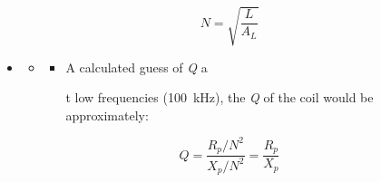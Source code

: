 \begin{equation}
N = \sqrt{\dfrac{L}{A_L}}
\end{equation}

\begin{itemize}
	\item[]
	\begin{itemize}
		\item[]
		\begin{itemize}
			\item A calculated guess of \textit{Q} a
			
			t low frequencies (\SI{100}{\kilo\hertz}), the \textit{Q} of	the coil would be approximately:
		\end{itemize} 
	\end{itemize} 
\end{itemize}

\begin{equation}
Q = \dfrac{R_p/N^2}{X_p/N^2} = \dfrac{R_p}{X_p}
\end{equation}